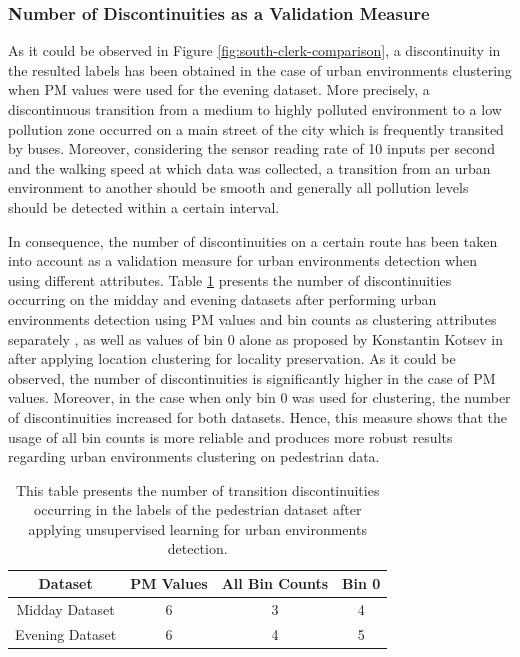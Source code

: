 \documentclass[bsc,frontabs,twoside,singlespacing, parskip,deptreport]{infthesis}     %
\begin{document}
\subsubsection*{Number of Discontinuities as a Validation Measure}

As it could be observed in Figure \ref{fig:south-clerk-comparison}, a discontinuity in the resulted labels has been obtained in the case of urban environments clustering when PM values were used for the evening dataset. More precisely, a discontinuous transition from a medium to highly polluted environment to a low pollution zone occurred on a main street of the city which is frequently transited by buses. Moreover, considering the sensor reading rate of 10 inputs per second and the walking speed at which data was collected, a transition from an urban environment to another should be smooth and generally all pollution levels should be detected within a certain interval.

In consequence, the number of discontinuities on a certain route has been taken into account as a validation measure for urban environments detection when using different attributes. Table \ref{table:discontinuities-meadows} presents the number of discontinuities occurring on the midday and evening datasets after performing urban environments detection using PM values and bin counts as clustering attributes separately , as well as values of bin 0 alone as proposed by Konstantin Kotsev in \cite{Kotsev2015}after applying location clustering for locality preservation. As it could be observed, the number of discontinuities is significantly higher in the case of PM values. Moreover, in the case when only bin 0 was used for clustering, the number of discontinuities increased for both datasets. Hence, this measure shows that the usage of all bin counts is more reliable and produces more robust results regarding urban environments clustering on pedestrian data.

\begin{table}[h!]
\centering
 \begin{tabular}{||c | c | c | c||} 
 \hline
 Dataset & PM Values & All Bin Counts & Bin 0 \\ [0.5ex] 
 \hline\hline
 Midday Dataset & 6 & 3  & 4 \\ 
 \hline
 Evening Dataset & 6 & 4 & 5 \\
 \hline
\end{tabular}
\caption{This table presents the number of transition discontinuities occurring in the labels of the pedestrian dataset after applying unsupervised learning for urban environments detection.}
\label{table:discontinuities-meadows}
\end{table}
\end{document}
